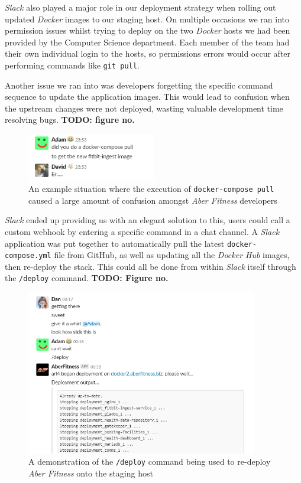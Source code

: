\textit{Slack} also played a major role in our deployment strategy when rolling out updated \textit{Docker} images to our staging host. On multiple occasions we ran into permission issues whilst trying to deploy on the two \textit{Docker} hosts we had been provided by the Computer Science department. Each member of the team had their own individual login to the hosts, so permissions errors would occur after performing commands like \lstinline{git pull}. 

Another issue we ran into was developers forgetting the specific command sequence to update the application images. This would lead to confusion when the upstream changes were not deployed, wasting valuable development time resolving bugs. \textbf{TODO: figure no.}

\begin{figure}[H]
    \centering
    \includegraphics[width=0.5\textwidth]{Images/aberfitness_slack_bot_reason_why.png}
    \caption{An example situation where the execution of \lstinline{docker-compose pull} caused a large amount of confusion amongst \textit{Aber Fitness} developers}
\end{figure}


\textit{Slack} ended up providing us with an elegant solution to this, users could call a custom webhook by entering a specific command in a chat channel. A \textit{Slack} application was put together to automatically pull the latest \lstinline{docker-compose.yml} file from GitHub, as well as updating all the \textit{Docker Hub} images, then re-deploy the stack. This could all be done from within \textit{Slack} itself through the \lstinline{/deploy} command. \textbf{TODO: Figure no.}

\begin{figure}[H]
    \centering
    \includegraphics[width=0.9\textwidth]{Images/aberfitness_slack_bot.png}
    \caption{A demonstration of the \lstinline{/deploy} command being used to re-deploy \textit{Aber Fitness} onto the staging host}
\end{figure}

